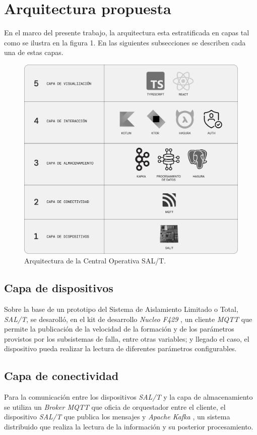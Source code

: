 
\section{Arquitectura propuesta}

En el marco del presente trabajo, la arquitectura esta estratificada en capas
tal como se ilustra en la figura 1. En las siguientes subsecciones se describen cada una de estas capas.

\begin{figure}[ht]
  \centering 
  \includegraphics[width=.48\textwidth]{images/v2.1.0/cuadro.jpg}
  \caption{Arquitectura de la Central Operativa SAL/T.}
  \label{fig:diagBloques}
\end{figure}

\subsection{Capa de dispositivos}

Sobre la base de un prototipo del Sistema de Aislamiento Limitado o Total, \textit{SAL/T}, se desarolló, en el kit de desarrollo \textit{Nucleo F429} \cite{b8}, un cliente \textit{MQTT} que permite la publicación de la velocidad de la formación y de los parámetros provistos por los subsistemas de falla, entre otras variables; y llegado el caso, el dispositivo pueda realizar la lectura de diferentes parámetros configurables.

\subsection{Capa de conectividad}

Para la comunicación entre los dispositivos \textit{SAL/T} y la capa de almacenamiento se utiliza un \textit{Broker MQTT} que oficia de orquestador entre el cliente, el dispositivo \textit{SAL/T} que publica los mensajes y \textit{Apache Kafka} \cite{b9}, un sistema distribuido que realiza la lectura de la información y su posterior procesamiento. 

